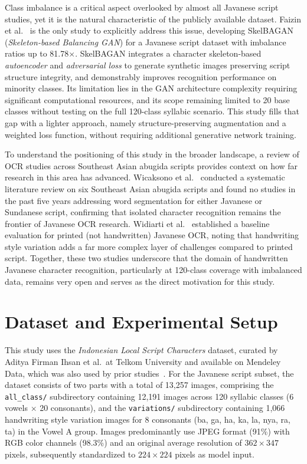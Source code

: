\documentclass[conference]{IEEEtran}
\begin{document}
Class imbalance is a critical aspect overlooked by almost all
Javanese script studies, yet it is the natural characteristic of
the publicly available dataset.
Faizin et al.~\cite{faizin2025} is the only study to explicitly
address this issue, developing SkelBAGAN
(\textit{Skeleton-based Balancing GAN}) for a Javanese script dataset
with imbalance ratios up to 81.78$\times$.
SkelBAGAN integrates a character skeleton-based \textit{autoencoder}
and \textit{adversarial loss} to generate synthetic images preserving
script structure integrity, and demonstrably improves recognition
performance on minority classes.
Its limitation lies in the GAN architecture complexity requiring
significant computational resources, and its scope remaining limited
to 20 base classes without testing on the full 120-class syllabic
scenario.
This study fills that gap with a lighter approach, namely structure-preserving
augmentation and a weighted loss function, without requiring
additional generative network training.

To understand the positioning of this study in the broader landscape,
a review of OCR studies across Southeast Asian abugida scripts
provides context on how far research in this area has advanced.
Wicaksono et al.~\cite{wicaksono2024} conducted a systematic
literature review on six Southeast Asian abugida scripts and found
no studies in the past five years addressing word segmentation for
either Javanese or Sundanese script, confirming that isolated character
recognition remains the frontier of Javanese OCR research.
Widiarti et al.~\cite{widiarti2026} established a baseline
evaluation for printed (not handwritten) Javanese OCR, noting that
handwriting style variation adds a far more complex layer of
challenges compared to printed script.
Together, these two studies underscore that the domain of
handwritten Javanese character recognition, particularly at
120-class coverage with imbalanced data, remains very open and
serves as the direct motivation for this study.

\section{Dataset and Experimental Setup}
\label{sec:dataset}

This study uses the \textit{Indonesian Local Script Characters} dataset,
curated by Aditya Firman Ihsan et al.\ at Telkom University and
available on Mendeley Data, which was also used by prior
studies~\cite{wisesty2026}.
For the Javanese script subset, the dataset consists of two parts with
a total of 13,257 images, comprising the \texttt{all\_class/} subdirectory
containing 12,191 images across 120 syllabic classes (6 vowels
$\times$ 20 consonants), and the \texttt{variations/} subdirectory
containing 1,066 handwriting style variation images for 8 consonants
(ba, ga, ha, ka, la, nya, ra, ta) in the Vowel A group.
Images predominantly use JPEG format (91\%) with RGB color channels
(98.3\%) and an original average resolution of $362\times347$ pixels,
subsequently standardized to $224\times224$ pixels as model input.
\end{document}
